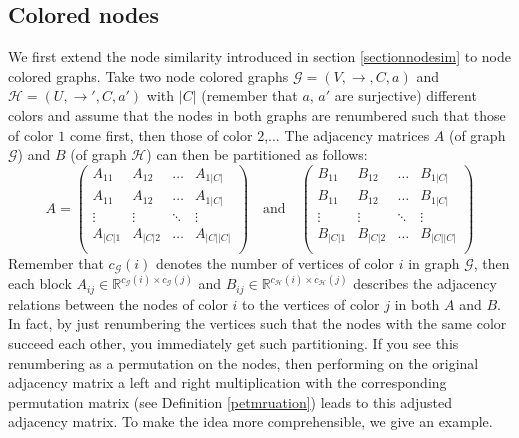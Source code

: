\documentclass[a4paper,11pt]{report}
\newcommand{\R}{{\mathbb R}}
\newcommand{\graf}{\mathscr{G}}
\newcommand{\grafeen}{\mathscr{H}}
\begin{document}
\subsection{Colored nodes}
We first extend the node similarity introduced in section \ref{sectionnodesim} to 
node colored graphs. Take two node colored graphs $\graf=(V,\to, C, a)$ and $\grafeen=(U,\to', C, a')$ with $|C|$ (remember that $a$, $a'$ are surjective) different colors and assume that the nodes 
in both graphs are renumbered such that those of color $1$ come first, then 
those of color $2$,... The adjacency matrices $A$ (of graph $\graf$) and $B$ (of graph $\grafeen$) 
can then be partitioned as follows:
$$A = \begin{pmatrix}
A_{11} & A_{12} & \ldots & A_{1|C|}\\
A_{11} & A_{12} & \ldots & A_{1|C|}\\
\vdots & \vdots & \ddots & \vdots\\
A_{|C|1} & A_{|C|2} & \ldots & A_{|C||C|}\\
\end{pmatrix}
 \quad \text{and} \quad
 \begin{pmatrix}
B_{11} & B_{12} & \ldots & B_{1|C|}\\
B_{11} & B_{12} & \ldots & B_{1|C|}\\
\vdots & \vdots & \ddots & \vdots\\
B_{|C|1} & B_{|C|2} & \ldots & B_{|C||C|}\\
\end{pmatrix}$$
Remember that $c_\graf(i)$ denotes the number of vertices of color $i$ in graph $\graf$, then each block $A_{ij} \in \R^{c_\graf(i)\times c_\graf(j)}$ and $B_{ij} \in \R^{c_\grafeen(i)\times c_\grafeen(j)}$ 
describes the adjacency relations between the nodes of color $i$ to the vertices 
of color $j$ in both $A$ and $B$. In fact, by just renumbering the vertices such 
that the nodes with the same color succeed each other, you immediately get such 
partitioning. If you see this renumbering as a permutation on the nodes,
then performing on the original adjacency matrix a left and right multiplication with the corresponding permutation matrix (see Definition 
\ref{petmruation}) leads to this adjusted adjacency matrix.
To make the idea more comprehensible, we give an example.
\end{document}
